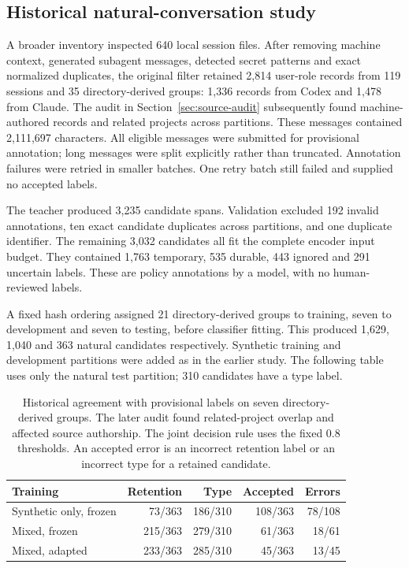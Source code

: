 \subsection{Historical natural-conversation study}
A broader inventory inspected 640 local session files. After removing machine
context, generated subagent messages, detected secret patterns and exact
normalized duplicates, the original filter retained 2,814 user-role records from 119 sessions
and 35 directory-derived groups: 1,336 records from Codex and 1,478 from Claude. The audit in Section~\ref{sec:source-audit} subsequently found machine-authored records and related projects across partitions. These
messages contained 2,111,697 characters. All eligible messages were submitted
for provisional annotation; long messages were split explicitly rather than
truncated. Annotation failures were retried in smaller batches. One retry batch
still failed and supplied no accepted labels.

The teacher produced 3,235 candidate spans. Validation excluded 192 invalid
annotations, ten exact candidate duplicates across partitions, and one duplicate
identifier. The remaining 3,032 candidates all fit the complete encoder input
budget. They contained 1,763 temporary, 535 durable, 443 ignored and 291 uncertain
labels. These are policy annotations by a model, with no human-reviewed labels.

A fixed hash ordering assigned 21 directory-derived groups to training, seven to
development and seven to testing, before classifier fitting. This produced
1,629, 1,040 and 363 natural candidates respectively. Synthetic training and
development partitions were added as in the earlier study. The following table
uses only the natural test partition; 310 candidates have a type label.

\begin{table}[htbp]
\centering
\begin{tabular}{lrrrr}
\toprule
Training & Retention & Type & Accepted & Errors\\
\midrule
Synthetic only, frozen & 73/363 & 186/310 & 108/363 & 78/108\\
Mixed, frozen & 215/363 & 279/310 & 61/363 & 18/61\\
Mixed, adapted & 233/363 & 285/310 & 45/363 & 13/45\\
\bottomrule
\end{tabular}
\caption{Historical agreement with provisional labels on seven directory-derived groups. The later audit found related-project overlap and affected source authorship.
The joint decision rule uses the fixed 0.8 thresholds. An accepted error is an
incorrect retention label or an incorrect type for a retained candidate.}
\label{tab:expanded-classification}
\end{table}

